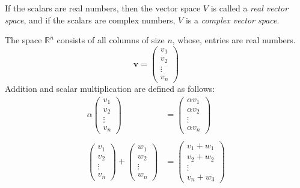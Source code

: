 \documentclass[12pt letter]{report}
\begin{document}
If the scalars are real numbers, then the vector space $V$ is called a \textit{real vector space}, and if the scalars
are complex numbers, $V$ is a \textit{complex vector space}.


The space $\mathbb{R}^{n}$ consists of all columns of size $n$, whose, entries are real numbers.
\[
  \mathbf{v} = \begin{pmatrix} v_1 \\  v_2 \\  \vdots  \\  v_n  \end{pmatrix}
\]
Addition and scalar multiplication are defined as follows:
\begin{align*}
  \alpha \begin{pmatrix} v_1 \\ v_2 \\ \vdots \\ v_n \end{pmatrix}                                                   & = \begin{pmatrix} \alpha v_1 \\ \alpha v_2 \\
                                                                                                                           \vdots
                                                                                                                           \\
                                                                                                                           \alpha
                                                                                                                           v_n\end{pmatrix}
  \\
  \\
  \begin{pmatrix} v_1\\ v_2 \\  \vdots\\ v_n \end{pmatrix} + \begin{pmatrix} w_1\\ w_2\\  \vdots\\ w_n \end{pmatrix} & =
  \begin{pmatrix} v_1 + w_1\\ v_2+w_2 \\  \vdots\\ v_n + w_3 \end{pmatrix}                                                                                        \\
\end{align*}
\end{document}

